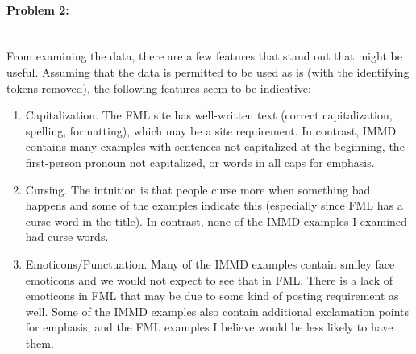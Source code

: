 \documentclass[12pt]{article}
\begin{document}
\paragraph{{\bf Problem 2:}}
\text{} \\
From examining the data, there are a few features that stand out that might be useful.  Assuming that the data is permitted to be used as is (with the identifying tokens removed), the following features seem to be indicative:
\begin{enumerate}
\item Capitalization.  The FML site has well-written text (correct capitalization, spelling, formatting), which may be a site requirement.  In contrast, IMMD contains many examples with sentences not capitalized at the beginning, the first-person pronoun not capitalized, or words in all caps for emphasis.
\item Cursing.  The intuition is that people curse more when something bad happens and some of the examples indicate this (especially since FML has a curse word in the title).  In contrast, none of the IMMD examples I examined had curse words.
\item Emoticons/Punctuation.  Many of the IMMD examples contain smiley face emoticons and we would not expect to see that in FML.  There is a lack of emoticons in FML that may be due to some kind of posting requirement as well.  Some of the IMMD examples also contain additional exclamation points for emphasis, and the FML examples I believe would be less likely to have them.
\end{enumerate}
\end{document}
